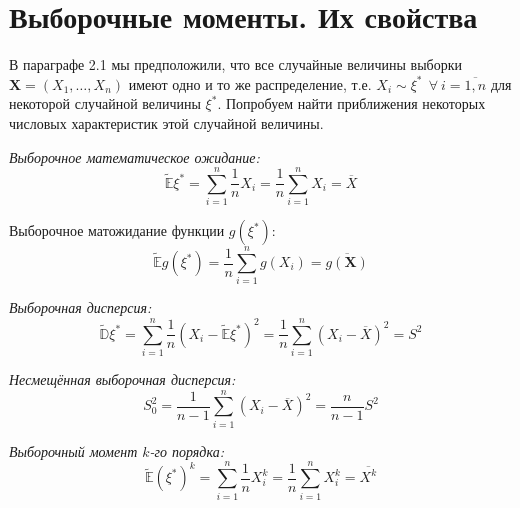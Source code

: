 \section{Выборочные моменты. Их свойства}

В параграфе 2.1 мы предположили, что все случайные величины выборки $\mathbf{X} = \left(X_1, \ldots, X_n\right)$ имеют одно и то же распределение, т.е. $X_i \sim \xi^*~~\forall~i = \overline{1, n}$ для некоторой случайной величины $\xi^*$. Попробуем найти приближения некоторых числовых характеристик этой случайной величины.
\begin{defn}
{\it Выборочное математическое ожидание:} 
\begin{equation*}
    \tilde{\mathbb{E}} \xi^{*}=\sum\limits_{i=1}^{n} \frac{1}{n} X_{i}=\frac{1}{n} \sum\limits_{i=1}^{n} X_{i}=\overline{X}
\end{equation*}

Выборочное матожидание функции $g(\xi^{*})$:
\begin{equation*}
    \tilde{\mathbb{E}} g\left(\xi^{*}\right)=\frac{1}{n} \sum\limits_{i=1}^{n} g\left(X_{i}\right)=\overline{g(\mathbf{X})}
\end{equation*}
\end{defn}

\begin{defn}
{\it Выборочная дисперсия:}
\begin{equation*}
    \tilde{\mathbb{D}} \xi^{*}=\sum\limits_{i=1}^{n} \frac{1}{n}(X_{i}-\tilde{\mathbb{E}} \xi^{*})^{2}=\frac{1}{n} \sum\limits_{i=1}^{n}(X_{i}-\overline{X})^{2}=S^{2}
\end{equation*}
\end{defn}

\begin{defn}
{\it Несмещённая выборочная дисперсия:} 
\begin{equation*}
    S_{0}^{2}=\frac{1}{n-1} \sum\limits_{i=1}^{n}\left(X_{i}-\overline{X}\right)^{2} = \frac{n}{n-1} S^2
\end{equation*}
\end{defn}

\begin{defn}
{\it Выборочный момент $k$-го порядка:}
\begin{equation*}
    \tilde{\mathbb{E}}(\xi^{*})^{k}=\sum\limits_{i=1}^{n} \frac{1}{n} X_{i}^{k}=\frac{1}{n} \sum\limits_{i=1}^{n} X_{i}^{k}=\overline{X^{k}}
\end{equation*}
\end{defn}

